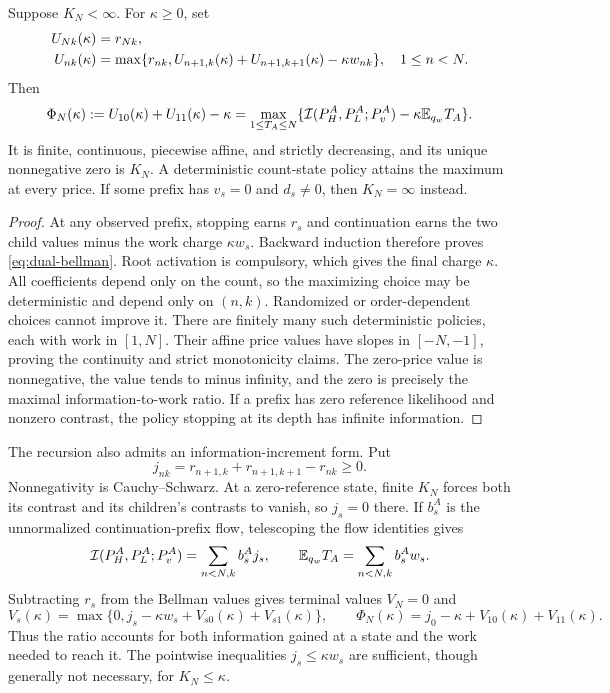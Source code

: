 \begin{proposition}\label{prop:dual-bellman}
Suppose $K_N<\infty$. For $\kappa\ge0$, set
\begin{align}
 U_{Nk}(\kappa)&=r_{Nk},\notag\\
 U_{nk}(\kappa)&=\max\{r_{nk},
 U_{n+1,k}(\kappa)+U_{n+1,k+1}(\kappa)-\kappa w_{nk}\},
 \quad 1\le n<N.
 \label{eq:dual-bellman}
\end{align}
Then
\begin{equation}
 \Phi_N(\kappa):=U_{10}(\kappa)+U_{11}(\kappa)-\kappa
 =\max_{1\le T_A\le N}
 \{\mathcal I(P_H^A,P_L^A;P_v^A)-\kappa\mathbb E_{q_w}T_A\}.
 \label{eq:dual-price-value}
\end{equation}
It is finite, continuous, piecewise affine, and strictly decreasing, and
its unique nonnegative zero is $K_N$. A deterministic count-state policy
attains the maximum at every price. If some prefix has $v_s=0$ and
$d_s\ne0$, then $K_N=\infty$ instead.
\end{proposition}

\begin{proof}
At any observed prefix, stopping earns $r_s$ and continuation earns the
two child values minus the work charge $\kappa w_s$. Backward induction
therefore proves \eqref{eq:dual-bellman}. Root activation is compulsory,
which gives the final charge $\kappa$. All coefficients depend only on
the count, so the maximizing choice may be deterministic and depend only
on $(n,k)$. Randomized or order-dependent choices cannot improve it.
There are finitely many such deterministic policies, each with work in
$[1,N]$. Their affine price values have slopes in $[-N,-1]$, proving the
continuity and strict monotonicity claims. The zero-price value is
nonnegative, the value tends to minus infinity, and the zero is precisely
the maximal information-to-work ratio. If a prefix has zero reference
likelihood and nonzero contrast, the policy stopping at its depth has
infinite information.
\end{proof}

The recursion also admits an information-increment form. Put
\begin{equation}
 j_{nk}=r_{n+1,k}+r_{n+1,k+1}-r_{nk}\ge0.
 \label{eq:dual-information-increment}
\end{equation}
Nonnegativity is Cauchy--Schwarz. At a zero-reference state, finite $K_N$
forces both its contrast and its children's contrasts to vanish, so
$j_s=0$ there. If $b_s^A$ is the unnormalized continuation-prefix flow,
telescoping the flow identities gives
\begin{equation}
 \mathcal I(P_H^A,P_L^A;P_v^A)=\sum_{n<N,k}b_s^A j_s,
 \qquad \mathbb E_{q_w}T_A=\sum_{n<N,k}b_s^A w_s.
 \label{eq:dual-increment-telescope}
\end{equation}
Subtracting $r_s$ from the Bellman values gives terminal values $V_N=0$
and
\[
 V_s(\kappa)=\max\{0,j_s-\kappa w_s+V_{s0}(\kappa)+V_{s1}(\kappa)\},
 \qquad
 \Phi_N(\kappa)=j_0-\kappa+V_{10}(\kappa)+V_{11}(\kappa).
\]
Thus the ratio accounts for both information gained at a state and the
work needed to reach it. The pointwise inequalities $j_s\le\kappa w_s$
are sufficient, though generally not necessary, for $K_N\le\kappa$.

